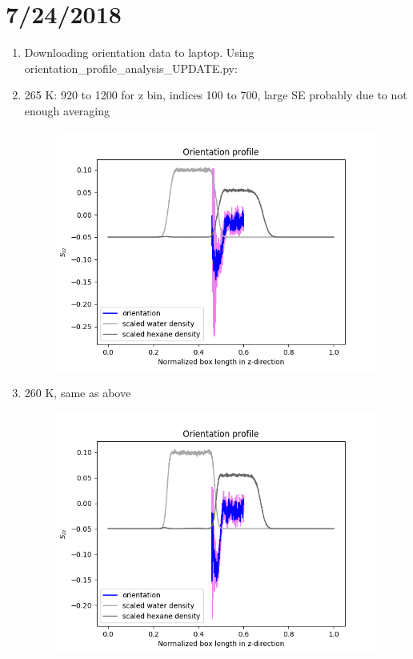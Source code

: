 \documentclass[12pt,reqno]{amsart}
\numberwithin{equation}{section}
\begin{document}
\section{7/24/2018}
\begin{enumerate}
\item Downloading orientation data to laptop.  Using orientation\_profile\_analysis\_UPDATE.py:

\item 265 K: 920 to 1200 for z bin, indices 100 to 700, large SE probably due to not enough averaging

\begin{figure}[H]
\centering
\includegraphics[scale=0.6]{full-265-1bead-orientations-hexane}
\end{figure}

\item 260 K, same as above

\begin{figure}[H]
\centering
\includegraphics[scale=0.6]{full-260-1bead-orientations-hexane}
\end{figure}


\end{enumerate}
\end{document}
